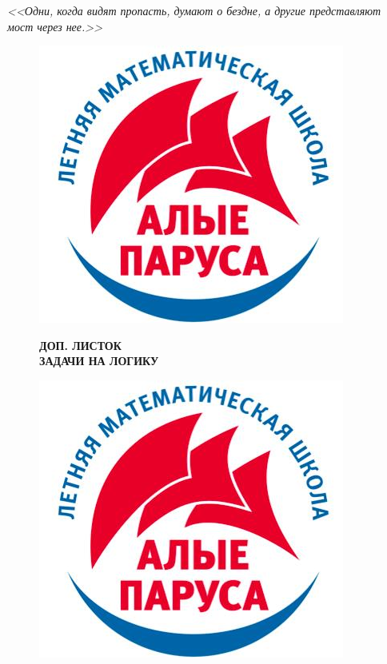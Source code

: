 \documentclass[12 pt, a4paper]{article}%
\begin{document}
	\newpage
	\begin{flushright}
		\textit{<<Одни, когда видят пропасть, думают о бездне, а другие представляют мост через нее.>>}
	\end{flushright}
	\begin{figure}[t]
		\begin{minipage}[h]{0.33\linewidth}
			\includegraphics[width=0.33\linewidth, left]{logo.jpg}
		\end{minipage}
		\begin{minipage}[h]{0.33\linewidth}
			\centering
			\large{\textbf{ДОП. ЛИСТОК\\ ЗАДАЧИ НА ЛОГИКУ}}\\
		\end{minipage}
		\begin{minipage}[h]{0.33\linewidth}
			\includegraphics[width=0.33\linewidth, right]{logo.jpg}
		\end{minipage}
		\label{ris:image1}
	\end{figure}
		
\end{document}
